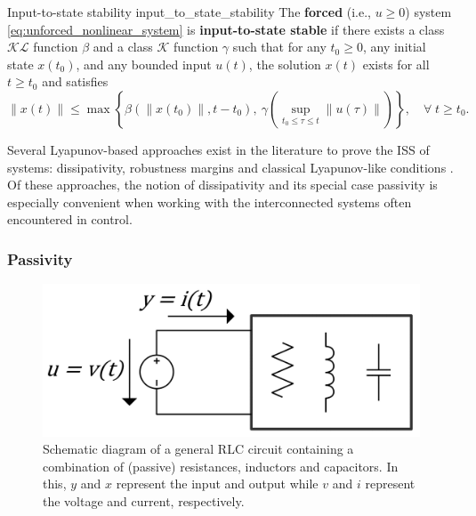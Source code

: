 \begin{definition}[list text=Input-to-state stability,after pre=\footnotetext{Definition 4.4 of \cite{khalilNonlinearControl2015} was slightly changed for consistency with the rest of the text.}]{Input-to-state stability \cite{khalilNonlinearControl2015}\footnotemark}{input_to_state_stability}
  The \textbf{forced} (i.e., $u \ge 0$) system \eqref{eq:unforced_nonlinear_system} is \textbf{input-to-state stable} if there exists a class $\mathcal{KL}$ function $\beta$ and a class $\mathcal{K}$ function $\gamma$ such that for any $t_0 \geq 0$, any initial state $x \left( t_0 \right)$, and any bounded input $u\left( t \right)$, the solution $x \left( t \right)$ exists for all $t \geq t_0$ and satisfies
  \begin{equation}
    \left\|x\left(t\right)\right\| \le \max \left\{ \beta\left(\left\|x\left(t_0 \right)\right\|, t-t_0\right), \ \gamma \left(\sup_{t_0 \leq \tau \leq t}{\left\|u\left(\tau \right)\right\|} \right)\right\}, \quad \forall \; t \geq t_0.
  \end{equation}
\end{definition}

Several Lyapunov-based approaches exist in the literature to prove the ISS of systems: dissipativity, robustness margins and classical Lyapunov-like conditions \cite{khalilNonlinearSystems2002,sontagInputtoStateStabilityProperty1995}. Of these approaches, the notion of dissipativity and its special case passivity is especially convenient when working with the interconnected systems often encountered in control.

\subsubsection{Passivity}

\begin{figure}
  \centering
  \includegraphics[width=0.55\linewidth]{figures/RLC_circuit.png}
  \caption[Schematic diagram of a general RLC circuit.]{Schematic diagram of a general RLC circuit containing a combination of (passive) resistances, inductors and capacitors. In this, $y$ and $x$ represent the input and output while $v$ and $i$ represent the voltage and current, respectively.} \label{fig:rlc_circuit}
\end{figure}

